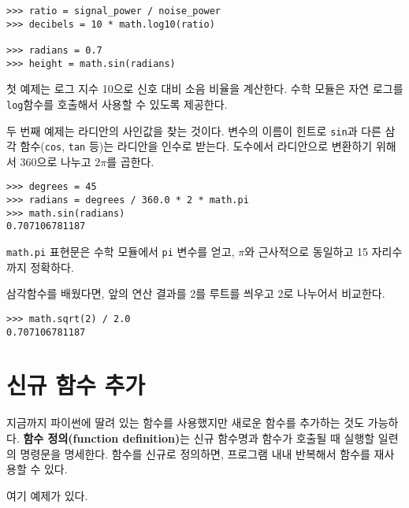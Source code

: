 
\beforeverb
\begin{verbatim}
>>> ratio = signal_power / noise_power
>>> decibels = 10 * math.log10(ratio)

>>> radians = 0.7
>>> height = math.sin(radians)
\end{verbatim}
\afterverb
%

첫 예제는 로그 지수 10으로 신호 대비 소음 비율을  계산한다.
수학 모듈은 자연 로그를 {\tt log}함수를 호출해서 사용할 수 있도록 제공한다.


두 번째 예제는 라디안의 사인값을 찾는 것이다. 변수의 이름이 힌트로 {\tt sin}과 다른 삼각 함수({\tt cos}, {\tt tan} 등)는 라디안을 인수로 받는다.
도수에서 라디안으로 변환하기 위해서 360으로 나누고 $2\pi$를 곱한다.

\beforeverb
\begin{verbatim}
>>> degrees = 45
>>> radians = degrees / 360.0 * 2 * math.pi
>>> math.sin(radians)
0.707106781187
\end{verbatim}
\afterverb
%

{\tt math.pi} 표현문은 수학 모듈에서 {\tt pi} 변수를 얻고, $\pi$와 근사적으로 동일하고 15 자리수까지 정확하다. 


삼각함수를 배웠다면, 앞의 연산 결과를 2를 루트를 씌우고 2로 나누어서 비교한다.


\beforeverb
\begin{verbatim}
>>> math.sqrt(2) / 2.0
0.707106781187
\end{verbatim}
\afterverb
%


\section{신규 함수 추가}

지금까지 파이썬에 딸려 있는 함수를 사용했지만 새로운 함수를 추가하는 것도 가능하다.
{\bf 함수 정의(function definition)}는 신규 함수명과 함수가 호출될 때 실행할 일련의 명령문을 명세한다.
함수를 신규로 정의하면, 프로그램 내내 반복해서 함수를 재사용할 수 있다. 


여기 예제가 있다.

